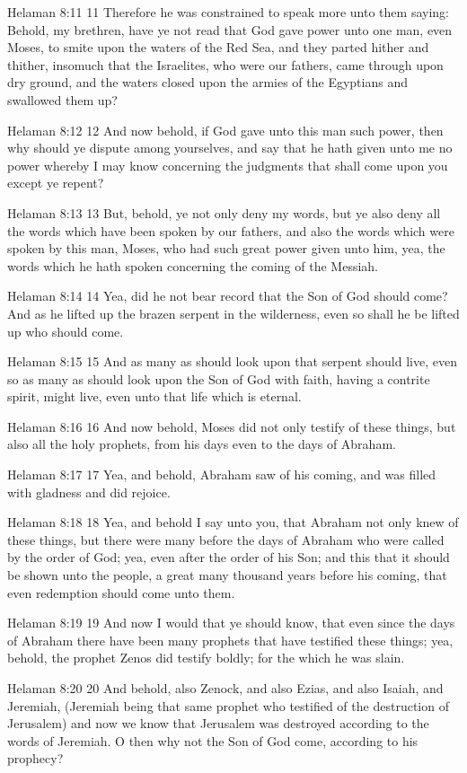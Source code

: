 Helaman 8:11
 11 Therefore he was constrained to speak more unto them saying:
Behold, my brethren, have ye not read that God gave power unto
one man, even Moses, to smite upon the waters of the Red Sea, and
they parted hither and thither, insomuch that the Israelites, who
were our fathers, came through upon dry ground, and the waters
closed upon the armies of the Egyptians and swallowed them up?

Helaman 8:12
 12 And now behold, if God gave unto this man such power, then
why should ye dispute among yourselves, and say that he hath
given unto me no power whereby I may know concerning the
judgments that shall come upon you except ye repent?

Helaman 8:13
 13 But, behold, ye not only deny my words, but ye also deny all
the words which have been spoken by our fathers, and also the
words which were spoken by this man, Moses, who had such great
power given unto him, yea, the words which he hath spoken
concerning the coming of the Messiah.

Helaman 8:14
 14 Yea, did he not bear record that the Son of God should come?
And as he lifted up the brazen serpent in the wilderness, even so
shall he be lifted up who should come.

Helaman 8:15
 15 And as many as should look upon that serpent should live,
even so as many as should look upon the Son of God with faith,
having a contrite spirit, might live, even unto that life which
is eternal.

Helaman 8:16
 16 And now behold, Moses did not only testify of these things,
but also all the holy prophets, from his days even to the days of
Abraham.

Helaman 8:17
 17 Yea, and behold, Abraham saw of his coming, and was filled
with gladness and did rejoice.

Helaman 8:18
 18 Yea, and behold I say unto you, that Abraham not only knew of
these things, but there were many before the days of Abraham who
were called by the order of God; yea, even after the order of his
Son; and this that it should be shown unto the people, a great
many thousand years before his coming, that even redemption
should come unto them.

Helaman 8:19
 19 And now I would that ye should know, that even since the days
of Abraham there have been many prophets that have testified
these things; yea, behold, the prophet Zenos did testify boldly;
for the which he was slain.

Helaman 8:20
 20 And behold, also Zenock, and also Ezias, and also Isaiah, and
Jeremiah, (Jeremiah being that same prophet who testified of the
destruction of Jerusalem) and now we know that Jerusalem was
destroyed according to the words of Jeremiah. O then why not the
Son of God come, according to his prophecy?

